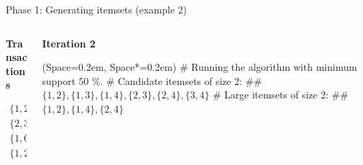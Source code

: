 \documentclass[12pt, aspectratio=1610]{beamer}
\newcommand{\listSpace}{0.2em}
\theoremstyle{plain}
\begin{document}
\begin{frame}[fragile]{Phase 1: Generating itemsets (example 2)}
\begin{Example}
\begin{columns}
	\begin{column}{0.25\textwidth}
		
		\begin{center}
			\textbf{Transactions}
		\end{center}
		\vspace{-1em}
		\begin{align*}
		\{ 1, 2, 7, 4 \} \\ 
		\{ 2, 3, 4 \} \\
		\{ 1, 6, 3 \} \\
		\{ 1, 2, 4, 5 \}
		\end{align*}
	\end{column}
	\begin{column}{0.75\textwidth}  %
		\begin{center}
			\textbf{Iteration 2}
		\end{center}
		\begin{easylist}[itemize]
			\ListProperties(Space=\listSpace, Space*=\listSpace)
			# Running the algorithm with minimum support 50 \%.
			# Candidate itemsets of size 2:
			## $\{1, 2\}, \{1, 3\}, \{1, 4\}, \{2, 3\}, \{2, 4\}, \{3, 4\}$
			# Large itemsets of size 2:
			## $\{1, 2\}, \{1, 4\}, \{2, 4\}$
		\end{easylist}
	\end{column}
\end{columns}
\end{Example}
\end{frame}
\end{document}
